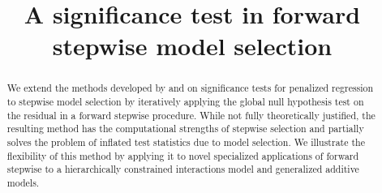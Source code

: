 \documentclass{imsart}
\begin{document}
\begin{frontmatter}

\title{A significance test in forward stepwise model selection}




\address{Department of Statistics\\  Stanford University\\ Sequoia
Hall \\390 Serra Mall\\ Stanford, CA 94305, U.S.A.\\ }


\begin{abstract}
  We extend the methods developed by \cite{significance:LASSO} and
  \cite{tests:adaptive} on significance tests for penalized
  regression to stepwise model selection by iteratively applying
  the global null hypothesis test on the residual in a forward stepwise
  procedure. While not fully theoretically justified, the resulting method
  has the computational strengths of stepwise selection and partially
  solves the problem of inflated test statistics due to model selection.
  We illustrate the flexibility of this method by applying it to
  novel specialized applications of forward stepwise to a hierarchically
  constrained interactions model and generalized additive models.
\end{abstract}

\begin{keyword}[class=AMS]
\end{keyword}

\begin{keyword}
\end{keyword}

\end{frontmatter}
\end{document}
